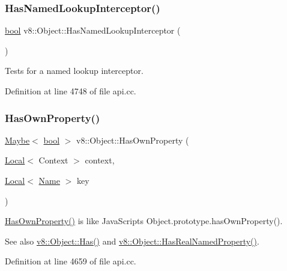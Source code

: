 \subsubsection{\texorpdfstring{Has\+Named\+Lookup\+Interceptor()}{HasNamedLookupInterceptor()}}
{\footnotesize\ttfamily \mbox{\hyperlink{classbool}{bool}} v8\+::\+Object\+::\+Has\+Named\+Lookup\+Interceptor (\begin{DoxyParamCaption}{ }\end{DoxyParamCaption})}

Tests for a named lookup interceptor. 

Definition at line 4748 of file api.\+cc.

\mbox{\label{classv8_1_1Object_acfe461c8e81a3d078d62ece594cb1994}} 
\subsubsection{\texorpdfstring{Has\+Own\+Property()}{HasOwnProperty()}}
{\footnotesize\ttfamily \mbox{\hyperlink{classv8_1_1Maybe}{Maybe}}$<$ \mbox{\hyperlink{classbool}{bool}} $>$ v8\+::\+Object\+::\+Has\+Own\+Property (\begin{DoxyParamCaption}\item[{\mbox{\hyperlink{classv8_1_1Local}{Local}}$<$ Context $>$}]{context,  }\item[{\mbox{\hyperlink{classv8_1_1Local}{Local}}$<$ \mbox{\hyperlink{classv8_1_1Name}{Name}} $>$}]{key }\end{DoxyParamCaption})}

\mbox{\hyperlink{classv8_1_1Object_acfe461c8e81a3d078d62ece594cb1994}{Has\+Own\+Property()}} is like Java\+Script\textquotesingle{}s Object.\+prototype.\+has\+Own\+Property().

See also \mbox{\hyperlink{classv8_1_1Object_a548a8d4329cf890be3698f1bff9b9837}{v8\+::\+Object\+::\+Has()}} and \mbox{\hyperlink{classv8_1_1Object_a305a692fa4a571a41755520b6344fa1c}{v8\+::\+Object\+::\+Has\+Real\+Named\+Property()}}. 

Definition at line 4659 of file api.\+cc.

\mbox{\label{classv8_1_1Object_ab2db3e98feaca9b9ae2f3fc3082ef3d5}} 
